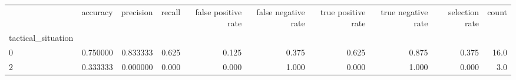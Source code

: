 \begin{tabular}{lrrrrrrrrr}
\toprule
{} &  accuracy &  precision &  recall &  false positive rate &  false negative rate &  true positive rate &  true negative rate &  selection rate &  count \\
tactical\_situation &           &            &         &                      &                      &                     &                     &                 &        \\
\midrule
0                  &  0.750000 &   0.833333 &   0.625 &                0.125 &                0.375 &               0.625 &               0.875 &           0.375 &   16.0 \\
2                  &  0.333333 &   0.000000 &   0.000 &                0.000 &                1.000 &               0.000 &               1.000 &           0.000 &    3.0 \\
\bottomrule
\end{tabular}
